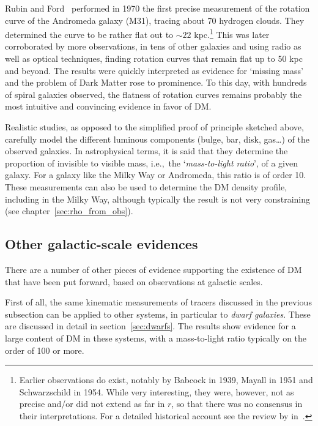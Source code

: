 \medskip 

Rubin and Ford~\cite{rotation_curves} performed in 1970 the first precise measurement of the rotation curve of the Andromeda galaxy (M31), tracing about 70 hydrogen clouds. They determined the curve to be rather flat out to $\sim22$ kpc.\footnote{Earlier observations do exist, notably by Babcock in 1939, Mayall in 1951 and Schwarzschild in 1954. While very interesting, they were, however, not as precise and/or did not extend as far in $r$, so that there was no consensus in their interpretations. For a detailed historical account see the review by  in~\cite{otherpastDMreviews}.} 
This was later corroborated by more observations, in tens of other galaxies and using radio as well as optical techniques, finding rotation curves that remain flat up to 50 kpc and beyond. 
The results were quickly interpreted as evidence for `missing mass' and the problem of Dark Matter rose to prominence. To this day, with hundreds of spiral galaxies observed, the flatness of rotation curves remains probably the most intuitive and convincing evidence in favor of DM. 

\smallskip

Realistic studies, as opposed to the simplified proof of principle sketched above, 
carefully model the different luminous components (bulge, bar, disk, gas\ldots) of the observed galaxies.
In astrophysical terms, it is said that they determine the proportion of invisible to visible mass, i.e.,~the `{\em mass-to-light ratio}', of a given galaxy. For a galaxy like the Milky Way or Andromeda, this ratio is of order 10. 
These measurements can also be used to determine the DM density profile, including in the Milky Way, although typically the result is not very constraining (see chapter~\ref{sec:rho_from_obs}). 




\subsection{Other galactic-scale evidences}\label{sec:othergalactic}
There are a number of  other pieces of evidence supporting the existence of DM that have been put forward, based on observations at galactic scales. 

First of all, the same kinematic measurements of tracers discussed in the previous subsection can be applied to other systems, in particular to {\it dwarf galaxies}. These are discussed in detail in section~\ref{sec:dwarfs}. The results show evidence for a large content of DM in these systems, with a mass-to-light ratio typically on the order of 100 or more.

